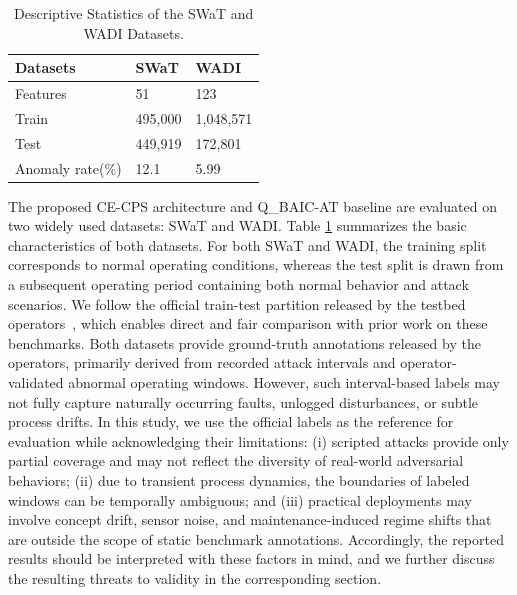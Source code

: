 \documentclass[pdflatex,sn-mathphys-num]{sn-jnl}%
\theoremstyle{thmstyleone}
\theoremstyle{thmstyletwo}%
\theoremstyle{thmstylethree}%
\begin{document}
\begin{table}[h!] 
\centering
\caption{Descriptive Statistics of the SWaT and WADI Datasets.}
\label{tab:dataset_summary}
\small
\begin{tabularx}{\linewidth}{XXX}
\toprule
\textbf{Datasets} & \textbf{SWaT} & \textbf{WADI} \\ 
\midrule
Features & 51 & 123 \\ 
Train &  495,000 &  1,048,571\\ 
Test &  449,919 & 172,801 \\ 
Anomaly rate(\%) & 12.1 & 5.99 \\   
\bottomrule
\end{tabularx}
\end{table}
The proposed CE-CPS architecture and Q\_BAIC-AT baseline are evaluated on two widely used datasets: SWaT and WADI. Table \ref{tab:dataset_summary} summarizes the basic characteristics of both datasets.
For both SWaT and WADI, the training split corresponds to normal operating conditions, whereas the test split is drawn from a subsequent operating period containing both normal behavior and attack scenarios. We follow the official train-test partition released by the testbed operators~\cite{ahmed2017wadi,mathur2016swat}, which enables direct and fair comparison with prior work on these benchmarks. Both datasets provide ground-truth annotations released by the operators, primarily derived from recorded attack intervals and operator-validated abnormal operating windows. However, such interval-based labels may not fully capture naturally occurring faults, unlogged disturbances, or subtle process drifts. In this study, we use the official labels as the reference for evaluation while acknowledging their limitations: (i) scripted attacks provide only partial coverage and may not reflect the diversity of real-world adversarial behaviors; (ii) due to transient process dynamics, the boundaries of labeled windows can be temporally ambiguous; and (iii) practical deployments may involve concept drift, sensor noise, and maintenance-induced regime shifts that are outside the scope of static benchmark annotations. Accordingly, the reported results should be interpreted with these factors in mind, and we further discuss the resulting threats to validity in the corresponding section.
\end{document}
